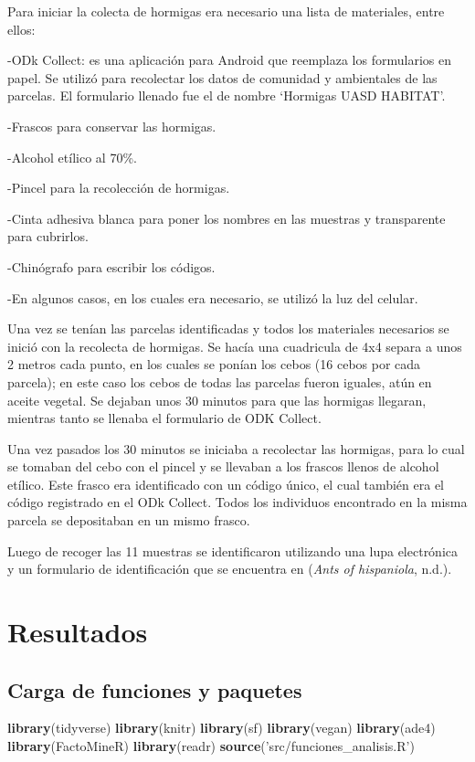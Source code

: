 \documentclass[11pt,]{article}
\newenvironment{Shaded}{\begin{snugshade}}{\end{snugshade}}
\newcommand{\KeywordTok}[1]{\textcolor[rgb]{0.13,0.29,0.53}{\textbf{#1}}}
\newcommand{\StringTok}[1]{\textcolor[rgb]{0.31,0.60,0.02}{#1}}
\newcommand{\NormalTok}[1]{#1}
\begin{document}
Para iniciar la colecta de hormigas era necesario una lista de
materiales, entre ellos:

-ODk Collect: es una aplicación para Android que reemplaza los
formularios en papel. Se utilizó para recolectar los datos de comunidad
y ambientales de las parcelas. El formulario llenado fue el de nombre
`Hormigas UASD HABITAT'.

-Frascos para conservar las hormigas.

-Alcohol etílico al 70\%.

-Pincel para la recolección de hormigas.

-Cinta adhesiva blanca para poner los nombres en las muestras y
transparente para cubrirlos.

-Chinógrafo para escribir los códigos.

-En algunos casos, en los cuales era necesario, se utilizó la luz del
celular.

Una vez se tenían las parcelas identificadas y todos los materiales
necesarios se inició con la recolecta de hormigas. Se hacía una
cuadricula de 4x4 separa a unos 2 metros cada punto, en los cuales se
ponían los cebos (16 cebos por cada parcela); en este caso los cebos de
todas las parcelas fueron iguales, atún en aceite vegetal. Se dejaban
unos 30 minutos para que las hormigas llegaran, mientras tanto se
llenaba el formulario de ODK Collect.

Una vez pasados los 30 minutos se iniciaba a recolectar las hormigas,
para lo cual se tomaban del cebo con el pincel y se llevaban a los
frascos llenos de alcohol etílico. Este frasco era identificado con un
código único, el cual también era el código registrado en el ODk
Collect. Todos los individuos encontrado en la misma parcela se
depositaban en un mismo frasco.

Luego de recoger las 11 muestras se identificaron utilizando una lupa
electrónica y un formulario de identificación que se encuentra en
(\emph{Ants of hispaniola}, n.d.).

\section{Resultados}\label{resultados}

\subsection{Carga de funciones y
paquetes}\label{carga-de-funciones-y-paquetes}

\begin{Shaded}
\begin{Highlighting}[]
\KeywordTok{library}\NormalTok{(tidyverse)}
\KeywordTok{library}\NormalTok{(knitr)}
\KeywordTok{library}\NormalTok{(sf)}
\KeywordTok{library}\NormalTok{(vegan)}
\KeywordTok{library}\NormalTok{(ade4)}
\KeywordTok{library}\NormalTok{(FactoMineR)}
\KeywordTok{library}\NormalTok{(readr)}
\KeywordTok{source}\NormalTok{(}\StringTok{'src/funciones_analisis.R'}\NormalTok{)}
\end{Highlighting}
\end{Shaded}
\end{document}
